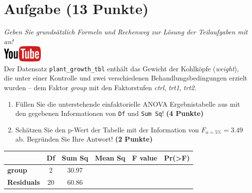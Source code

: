 \documentclass[a4paper, 10pt]{scrartcl}\usepackage[]{graphicx}\usepackage[]{xcolor}
\begin{document}
\clearpage

\section{Aufgabe \hfill (13 Punkte)}

\textit{Geben Sie grunds{\"a}tzlich Formeln und Rechenweg zur L{\"o}sung der
  Teilaufgaben mit an!} \\[1Ex]

\hfill\href{https://youtu.be/49hvImMwVyE}{\includegraphics[width =
  2cm]{img/youtube}}\\[1Ex]


Der Datensatz \texttt{plant\_growth\_tbl} enth{\"a}lt das Gewicht der Kohlk{\"o}pfe
(\textit{weight}), die unter einer Kontrolle und zwei verschiedenen
Behandlungsbedingungen erzielt wurden -- dem Faktor \textit{group} mit den
Faktorstufen \textit{ctrl}, \textit{trt1}, \textit{trt2}.



\begin{enumerate}
\item F{\"u}llen Sie die unterstehende einfaktorielle ANOVA Ergebnistabelle aus
  mit den gegebenen Informationen von \texttt{Df} und \texttt{Sum Sq}!
  \textbf{(4 Punkte)}
\item Sch{\"a}tzen Sie den p-Wert der Tabelle mit der Information von
  $F_{\alpha = 5\%} = 3.49$ ab. Begr{\"u}nden Sie Ihre
  Antwort! \textbf{(2 Punkte)}
\end{enumerate}

\vspace{1Ex}

\begin{center}
  \Large
  \begin{tabular}{l|c|c|c|c|c}
     & \textbf{Df} & \textbf{Sum Sq} & \textbf{Mean Sq} & \textbf{F value} & \textbf{Pr(>F)} \strut\\
    \hline
   \textbf{group}  & 2 & 30.97 &  &  &  \strut\\
    \hline
   \textbf{Residuals}  & 20 & 60.86 &  &  &  \strut\\
  \end{tabular}
\end{center}
\end{document}
